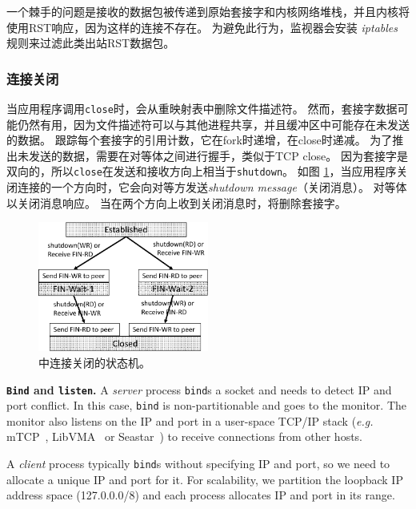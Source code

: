 一个棘手的问题是接收的数据包被传递到原始套接字和内核网络堆栈，并且内核将使用RST响应，因为这样的连接不存在。
为避免此行为，监视器会安装 \emph {iptables} 规则来过滤此类出站RST数据包。



\subsubsection{连接关闭}



当应用程序调用\texttt {close}时，\libipc {}会从重映射表中删除文件描述符。
然而，套接字数据可能仍然有用，因为文件描述符可以与其他进程共享，并且缓冲区中可能存在未发送的数据。
\libipc{} 跟踪每个套接字的引用计数，它在fork时递增，在close时递减。
为了推出未发送的数据，需要在对等体之间进行握手，类似于TCP close。
因为套接字是双向的，所以\texttt {close}在发送和接收方向上相当于\texttt {shutdown}。
如图 \ref{socksdirect:fig:conn-close}，当应用程序关闭连接的一个方向时，它会向对等方发送\emph {shutdown message}（关闭消息）。
对等体以关闭消息响应。
当\libipc {}在两个方向上收到关闭消息时，将删除套接字。


\begin{figure}[htbp]
	\centering
	\includegraphics[width=0.5\textwidth]{images/conn-close-new}	
	\caption{\libipc{} 中连接关闭的状态机。}
	\label{socksdirect:fig:conn-close}
\end{figure}


\iffalse

\textbf{\texttt{Bind} and \texttt{listen}.}
A \emph{server} process \texttt{bind}s a socket and needs to detect IP and port conflict. In this case, \texttt{bind} is non-partitionable and goes to the monitor. The monitor also listens on the IP and port in a user-space TCP/IP stack (\textit{e.g.} mTCP~\cite{jeong2014mtcp}, LibVMA~\cite{libvma} or Seastar~\cite{seastar}) to receive connections from other hosts.

A \emph{client} process typically \texttt{bind}s without specifying IP and port, so we need to allocate a unique IP and port for it. For scalability, we partition the loopback IP address space (127.0.0.0/8) and each process allocates IP and port in its range.


